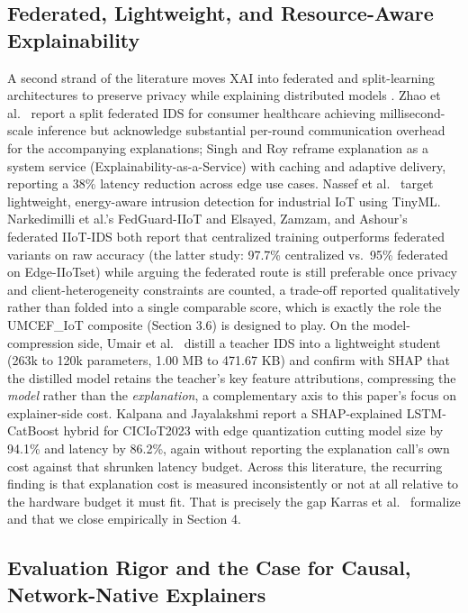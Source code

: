 \subsection{Federated, Lightweight, and Resource-Aware Explainability}\label{federated-lightweight-and-resource-aware-explainability}

A second strand of the literature moves XAI into federated and split-learning architectures to preserve privacy while explaining distributed models \citep{ref1,ref15,ref16}. Zhao et al.~\citep{ref17} report a split federated IDS for consumer healthcare achieving millisecond-scale inference but acknowledge substantial per-round communication overhead for the accompanying explanations; Singh and Roy \citep{ref18} reframe explanation as a system service (Explainability-as-a-Service) with caching and adaptive delivery, reporting a 38\% latency reduction across edge use cases. Nassef et al.~\citep{ref19} target lightweight, energy-aware intrusion detection for industrial IoT using TinyML. Narkedimilli et al.'s FedGuard-IIoT \citep{ref45} and Elsayed, Zamzam, and Ashour's federated IIoT-IDS \citep{ref46} both report that centralized training outperforms federated variants on raw accuracy (the latter study: 97.7\% centralized vs.~95\% federated on Edge-IIoTset) while arguing the federated route is still preferable once privacy and client-heterogeneity constraints are counted, a trade-off reported qualitatively rather than folded into a single comparable score, which is exactly the role the UMCEF\_IoT composite (Section 3.6) is designed to play. On the model-compression side, Umair et al.~\citep{ref27} distill a teacher IDS into a lightweight student (263k to 120k parameters, 1.00 MB to 471.67 KB) and confirm with SHAP that the distilled model retains the teacher's key feature attributions, compressing the \emph{model} rather than the \emph{explanation}, a complementary axis to this paper's focus on explainer-side cost. Kalpana and Jayalakshmi \citep{ref28} report a SHAP-explained LSTM-CatBoost hybrid for CICIoT2023 with edge quantization cutting model size by 94.1\% and latency by 86.2\%, again without reporting the explanation call's own cost against that shrunken latency budget. Across this literature, the recurring finding is that explanation cost is measured inconsistently or not at all relative to the hardware budget it must fit. That is precisely the gap Karras et al.~\citep{ref1} formalize and that we close empirically in Section 4.

\subsection{Evaluation Rigor and the Case for Causal, Network-Native Explainers}\label{evaluation-rigor-and-the-case-for-causal-network-native-explainers}

